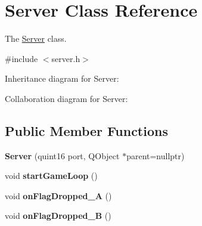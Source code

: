 \hypertarget{class_server}{}\section{Server Class Reference}
\label{class_server}


The \hyperlink{class_server}{Server} class.  




{\ttfamily \#include $<$server.\+h$>$}



Inheritance diagram for Server\+:


Collaboration diagram for Server\+:
\subsection*{Public Member Functions}
\begin{DoxyCompactItemize}
\item 
{\bfseries Server} (quint16 port, Q\+Object $\ast$parent=nullptr)\hypertarget{class_server_aa41f7ac2f58d192ffc4b7ffdcfdc83ff}{}\label{class_server_aa41f7ac2f58d192ffc4b7ffdcfdc83ff}

\item 
void {\bfseries start\+Game\+Loop} ()\hypertarget{class_server_a2d32bea48ed9aff99f0ecb8277d05400}{}\label{class_server_a2d32bea48ed9aff99f0ecb8277d05400}

\item 
void {\bfseries on\+Flag\+Dropped\+\_\+A} ()\hypertarget{class_server_abefe3e8e3b6a182aae6d09e790f719cb}{}\label{class_server_abefe3e8e3b6a182aae6d09e790f719cb}

\item 
void {\bfseries on\+Flag\+Dropped\+\_\+B} ()\hypertarget{class_server_a8d7bc4d1128a12ccb9f3801277678460}{}\label{class_server_a8d7bc4d1128a12ccb9f3801277678460}

\end{DoxyCompactItemize}
